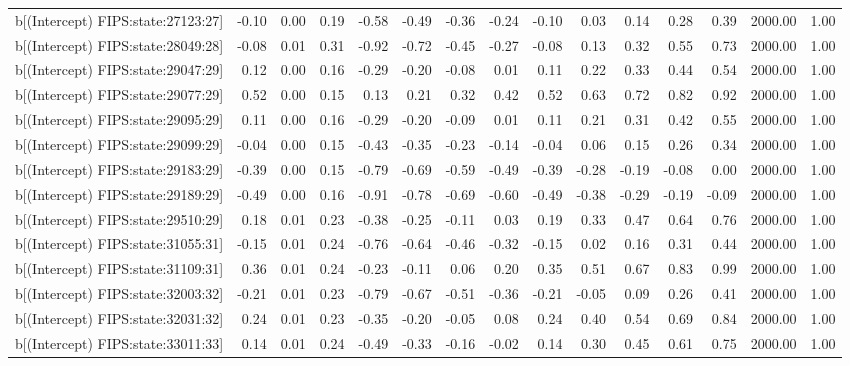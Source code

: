 \begin{table}[ht]
\begin{tabular}{rrrrrrrrrrrrrrr}
  b[(Intercept) FIPS:state:27123:27] & -0.10 & 0.00 & 0.19 & -0.58 & -0.49 & -0.36 & -0.24 & -0.10 & 0.03 & 0.14 & 0.28 & 0.39 & 2000.00 & 1.00 \\ 
  b[(Intercept) FIPS:state:28049:28] & -0.08 & 0.01 & 0.31 & -0.92 & -0.72 & -0.45 & -0.27 & -0.08 & 0.13 & 0.32 & 0.55 & 0.73 & 2000.00 & 1.00 \\ 
  b[(Intercept) FIPS:state:29047:29] & 0.12 & 0.00 & 0.16 & -0.29 & -0.20 & -0.08 & 0.01 & 0.11 & 0.22 & 0.33 & 0.44 & 0.54 & 2000.00 & 1.00 \\ 
  b[(Intercept) FIPS:state:29077:29] & 0.52 & 0.00 & 0.15 & 0.13 & 0.21 & 0.32 & 0.42 & 0.52 & 0.63 & 0.72 & 0.82 & 0.92 & 2000.00 & 1.00 \\ 
  b[(Intercept) FIPS:state:29095:29] & 0.11 & 0.00 & 0.16 & -0.29 & -0.20 & -0.09 & 0.01 & 0.11 & 0.21 & 0.31 & 0.42 & 0.55 & 2000.00 & 1.00 \\ 
  b[(Intercept) FIPS:state:29099:29] & -0.04 & 0.00 & 0.15 & -0.43 & -0.35 & -0.23 & -0.14 & -0.04 & 0.06 & 0.15 & 0.26 & 0.34 & 2000.00 & 1.00 \\ 
  b[(Intercept) FIPS:state:29183:29] & -0.39 & 0.00 & 0.15 & -0.79 & -0.69 & -0.59 & -0.49 & -0.39 & -0.28 & -0.19 & -0.08 & 0.00 & 2000.00 & 1.00 \\ 
  b[(Intercept) FIPS:state:29189:29] & -0.49 & 0.00 & 0.16 & -0.91 & -0.78 & -0.69 & -0.60 & -0.49 & -0.38 & -0.29 & -0.19 & -0.09 & 2000.00 & 1.00 \\ 
  b[(Intercept) FIPS:state:29510:29] & 0.18 & 0.01 & 0.23 & -0.38 & -0.25 & -0.11 & 0.03 & 0.19 & 0.33 & 0.47 & 0.64 & 0.76 & 2000.00 & 1.00 \\ 
  b[(Intercept) FIPS:state:31055:31] & -0.15 & 0.01 & 0.24 & -0.76 & -0.64 & -0.46 & -0.32 & -0.15 & 0.02 & 0.16 & 0.31 & 0.44 & 2000.00 & 1.00 \\ 
  b[(Intercept) FIPS:state:31109:31] & 0.36 & 0.01 & 0.24 & -0.23 & -0.11 & 0.06 & 0.20 & 0.35 & 0.51 & 0.67 & 0.83 & 0.99 & 2000.00 & 1.00 \\ 
  b[(Intercept) FIPS:state:32003:32] & -0.21 & 0.01 & 0.23 & -0.79 & -0.67 & -0.51 & -0.36 & -0.21 & -0.05 & 0.09 & 0.26 & 0.41 & 2000.00 & 1.00 \\ 
  b[(Intercept) FIPS:state:32031:32] & 0.24 & 0.01 & 0.23 & -0.35 & -0.20 & -0.05 & 0.08 & 0.24 & 0.40 & 0.54 & 0.69 & 0.84 & 2000.00 & 1.00 \\ 
  b[(Intercept) FIPS:state:33011:33] & 0.14 & 0.01 & 0.24 & -0.49 & -0.33 & -0.16 & -0.02 & 0.14 & 0.30 & 0.45 & 0.61 & 0.75 & 2000.00 & 1.00 \\ 

\end{tabular}
\end{table}
